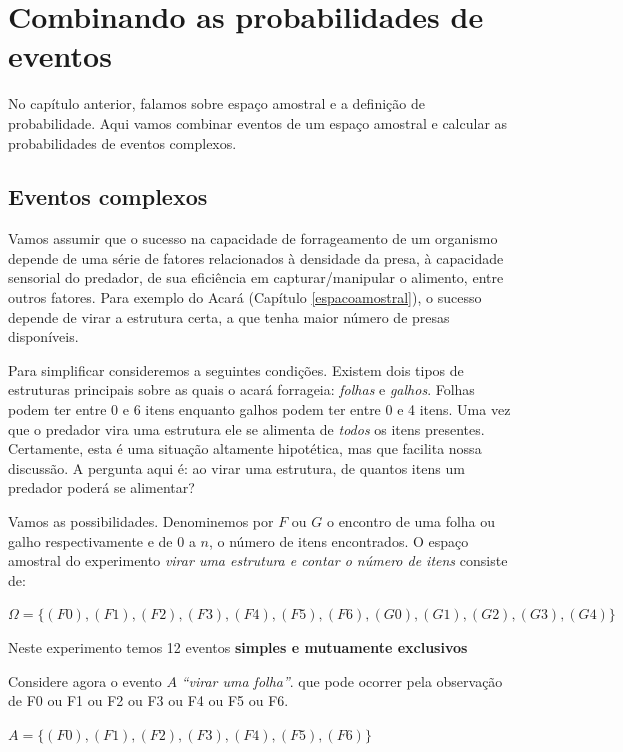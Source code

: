 \documentclass[
]{book}
\begin{document}
\hypertarget{probregras}{%
\chapter{Combinando as probabilidades de eventos}\label{probregras}}

No capítulo anterior, falamos sobre espaço amostral e a definição de probabilidade. Aqui vamos combinar eventos de um espaço amostral e calcular as probabilidades de eventos complexos.

\hypertarget{eventos-complexos}{%
\section{Eventos complexos}\label{eventos-complexos}}

Vamos assumir que o sucesso na capacidade de forrageamento de um organismo depende de uma série de fatores relacionados à densidade da presa, à capacidade sensorial do predador, de sua eficiência em capturar/manipular o alimento, entre outros fatores. Para exemplo do Acará (Capítulo \ref{espacoamostral}), o sucesso depende de virar a estrutura certa, a que tenha maior número de presas disponíveis.

Para simplificar consideremos a seguintes condições. Existem dois tipos de estruturas principais sobre as quais o acará forrageia: \emph{folhas} e \emph{galhos}. Folhas podem ter entre 0 e 6 itens enquanto galhos podem ter entre 0 e 4 itens. Uma vez que o predador vira uma estrutura ele se alimenta de \emph{todos} os itens presentes. Certamente, esta é uma situação altamente hipotética, mas que facilita nossa discussão. A pergunta aqui é: ao virar uma estrutura, de quantos itens um predador poderá se alimentar?

Vamos as possibilidades. Denominemos por \(F\) ou \(G\) o encontro de uma folha ou galho respectivamente e de \(0\) a \(n\), o número de itens encontrados. O espaço amostral do experimento \emph{virar uma estrutura e contar o número de itens} consiste de:

\(\Omega = \{(F0), (F1), (F2), (F3), (F4), (F5), (F6), (G0), (G1), (G2), (G3), (G4)\}\)

Neste experimento temos 12 eventos \textbf{simples e mutuamente exclusivos}

Considere agora o evento \(A\) \emph{``virar uma folha''}. que pode ocorrer pela observação de F0 ou F1 ou F2 ou F3 ou F4 ou F5 ou F6.

\(A = \{(F0), (F1), (F2), (F3), (F4), (F5), (F6)\}\)
\end{document}

